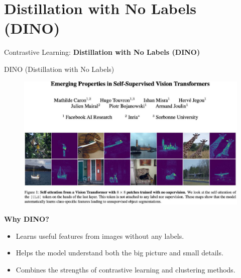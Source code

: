 \section{Distillation with No Labels (DINO)}
\begin{frame}{}
    \LARGE Contrastive Learning: \textbf{Distillation with No Labels (DINO)}
\end{frame}


\begin{frame}[allowframebreaks]{DINO (Distillation with No Labels)}
\begin{figure}
    \centering
    \includegraphics[width=\linewidth,height=0.9\textheight,keepaspectratio]{images/contrastive/slide_86_1_img.jpg}
\end{figure}

\framebreak

\textbf{Why DINO?}
\begin{itemize}
    \item Learns useful features from images without any labels.
    \item Helps the model understand both the big picture and small details.
    \item Combines the strengths of contrastive learning and clustering methods.
\end{itemize}

\framebreak


\end{frame}
